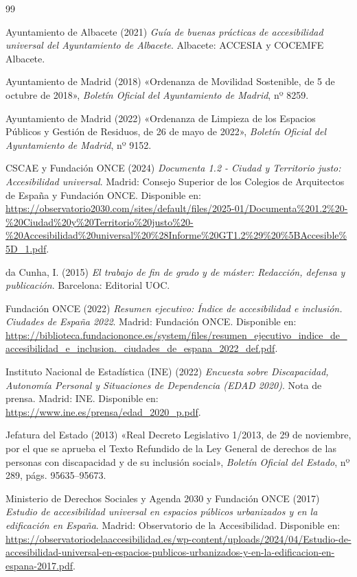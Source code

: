 \begin{thebibliography}{99}

Ayuntamiento de Albacete (2021) 
\textit{Guía de buenas prácticas de accesibilidad universal del Ayuntamiento de Albacete}. 
Albacete: ACCESIA y COCEMFE Albacete.

Ayuntamiento de Madrid (2018) 
«Ordenanza de Movilidad Sostenible, de 5 de octubre de 2018», 
\textit{Boletín Oficial del Ayuntamiento de Madrid}, nº 8259.

Ayuntamiento de Madrid (2022) 
«Ordenanza de Limpieza de los Espacios Públicos y Gestión de Residuos, de 26 de mayo de 2022», 
\textit{Boletín Oficial del Ayuntamiento de Madrid}, nº 9152.

CSCAE y Fundación ONCE (2024) 
\textit{Documenta 1.2 - Ciudad y Territorio justo: Accesibilidad universal}. 
Madrid: Consejo Superior de los Colegios de Arquitectos de España y Fundación ONCE. 
Disponible en: \url{https://observatorio2030.com/sites/default/files/2025-01/Documenta\%201.2\%20-\%20Ciudad\%20y\%20Territorio\%20justo\%20-\%20Accesibilidad\%20universal\%20\%28Informe\%20GT1.2\%29\%20\%5BAccesible\%5D_1.pdf}.

da Cunha, I. (2015) 
\textit{El trabajo de fin de grado y de máster: Redacción, defensa y publicación}. 
Barcelona: Editorial UOC.

Fundación ONCE (2022) 
\textit{Resumen ejecutivo: Índice de accesibilidad e inclusión. Ciudades de España 2022}. 
Madrid: Fundación ONCE. 
Disponible en: \url{https://biblioteca.fundaciononce.es/system/files/resumen_ejecutivo_indice_de_accesibilidad_e_inclusion._ciudades_de_espana_2022_def.pdf}.

Instituto Nacional de Estadística (INE) (2022) 
\textit{Encuesta sobre Discapacidad, Autonomía Personal y Situaciones de Dependencia (EDAD 2020)}. 
Nota de prensa. Madrid: INE. 
Disponible en: \url{https://www.ine.es/prensa/edad_2020_p.pdf}.

Jefatura del Estado (2013) 
«Real Decreto Legislativo 1/2013, de 29 de noviembre, por el que se aprueba el Texto Refundido de la Ley General de derechos de las personas con discapacidad y de su inclusión social», 
\textit{Boletín Oficial del Estado}, nº 289, págs. 95635--95673.

Ministerio de Derechos Sociales y Agenda 2030 y Fundación ONCE (2017) 
\textit{Estudio de accesibilidad universal en espacios públicos urbanizados y en la edificación en España}. 
Madrid: Observatorio de la Accesibilidad. 
Disponible en: \url{https://observatoriodelaaccesibilidad.es/wp-content/uploads/2024/04/Estudio-de-accesibilidad-universal-en-espacios-publicos-urbanizados-y-en-la-edificacion-en-espana-2017.pdf}.


\end{thebibliography}
